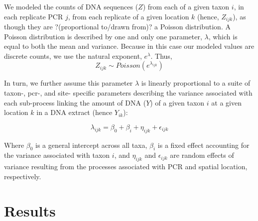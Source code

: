 \documentclass[11pt,letterpaper]{article} %
\begin{document}
We modeled the counts of DNA sequences ($Z$) from each of a given taxon $i$, in each replicate PCR $j$, from each replicate of a given location $k$ (hence, $Z_{ijk}$), as though they are ?(proportional to/drawn from)? a Poisson distribution. A Poisson distribution is described by one and only one parameter, $\lambda$, which is equal to both the mean and variance. Because in this case our modeled values are discrete counts, we use the natural exponent, $e^\lambda$. %
Thus,
\begin{equation}\label{some_cool_eqn_name}
	Z_{ijk} \sim Poisson(e^{\lambda_{ijk}})
\end{equation}

In turn, we further assume this parameter $\lambda$ is linearly proportional to a suite of taxon-, pcr-, and site- specific parameters describing the variance associated with each sub-process linking the amount of DNA ($Y$) of a given taxon $i$ at a given location $k$ in a DNA extract (hence $Y_{ik}$):

\begin{equation}\label{GLM}
	\lambda_{ijk} = \beta_0 + \beta_i + \eta_{ijk} + \epsilon_{ijk}
\end{equation}

Where $\beta_0$ is a general intercept across all taxa, $\beta_i$ is a fixed effect accounting for the variance associated with taxon $i$, and $\eta_{ijk}$ and $\epsilon_{ijk}$ are random effects of variance resulting from the processes associated with PCR and spatial location, respectively.




%

\section*{Results}
\end{document}
